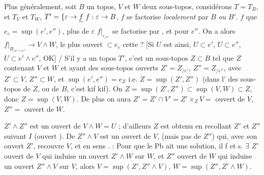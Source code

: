 \documentclass[11pt,a4paper]{article}
\begin{document}
\begin{enumerate}
    Plus généralement, soit $B$ un topos, $V$ et $W$ deux sous-topos,
    considérons $T = T_{B}$, et $T_{V}$ et $T_{W}$,  $T' =
    \{\varepsilon \to \struck{f}\ f : \varepsilon \to B$, $f$ se factorise
    \emph{localement} par $B$ \emph{ou} $B'$. 
    \ill{} \ill{}  $f$ que  $e_{\varepsilon} =
    \sup(e', e'')$,  plus 
    de $\varepsilon$ \struck{\ill{}}  $f|_{\varepsilon_{/e'}}$ se
    factorise par \ill{}, et  pour $e''$. On a alors
    $f|_{B_{/e' \wedge e''}} \to V \wedge W$, 
     le plus  ouvert \struck{\ill{}}
    $\subset e_{\varepsilon}$  cette  ?
    [Si \struck{\ill{}} $U$ \struck{\ill{}} est ainsi,  $U
    \subset e'$, $U \subset e''$,  $U \subset e' \wedge e''$,
    OK] / S'il y a un topos  $T'$, c'est un
    sous-topos \struck{\ill{}} $Z \subset B$ tel que $Z$  contenant $V$ et $W$ et ayant des sous-topos ouverts $Z' =
    Z_{/e'}$, $Z'' = Z_{/e''}$, avec $Z' \subset V$, $Z'' \subset W$, et
     $\sup(e', e'') = e_{Z}$ i.e. $Z = \sup(Z', Z'')$ (dans
    l' des sous-topos de $Z$, ou de $B$, c'est kif kif). On
     $Z = \sup(Z', Z'') \subset \sup(V, W) \subset Z$,
    donc $Z = \sup(V, W)$. De plus on aura  $Z' = Z' \cap V' = Z' \times_{Z} V =$ ouvert de $V$, $Z'' =$
    ouvert de $W$.

\end{enumerate}

 $Z' \wedge Z''$ est un ouvert de $V \wedge W = U$ ;
d'ailleurs $Z$ est obtenu en recollant $Z'$ et $Z''$ suivant $I$ (ouvert
). De  $Z'' \wedge V$ est un ouvert de $V$,
(mais pas \ill{}  de $Z''$) qui, avec son ouvert $Z'$, recouvre
$V$, et  en sens . \emph{} :
Pour que le Pb ait une solution, il f et s.   $\exists$ $Z'$  ouvert de $V$
qui induise \struck{\ill{}} un ouvert  $Z' \wedge W$ sur $W$, et
$Z''$  ouvert de $W$ qui induise un ouvert $Z'' \wedge V$
sur $V$, alors $V = \sup(Z', Z'' \wedge V)$, $W = \sup(Z'', Z' \wedge W)$.
\end{document}
